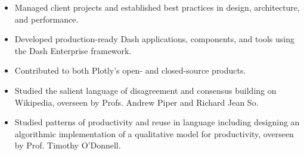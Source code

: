 \documentclass[10pt,ragged2e]{altacv}
\begin{document}
\divider

\begin{itemize}
      \item Managed client projects and established best practices in design, architecture,
            and performance.
      \item Developed production-ready Dash applications, components, and tools using the
            Dash Enterprise framework.
      \item Contributed to both Plotly’s open- and closed-source products.

\end{itemize}

\divider

\begin{itemize}
      \item Studied the salient language of disagreement and consensus building on
            Wikipedia, overseen by Profs. Andrew Piper and Richard Jean So.
\end{itemize}

\divider

\begin{itemize}
      \item Studied patterns of productivity and reuse in language including designing an
            algorithmic implementation of a qualitative model for productivity, overseen by
            Prof. Timothy O'Donnell.
\end{itemize}


\clearpage
\end{document}
